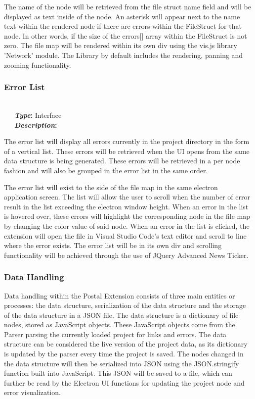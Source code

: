 \documentclass[letterpaper,10pt,titlepage,draftclsnofoot,onecolumn,onesided] {IEEEtran}
\newcommand{\bolditin}[2]{
	\-\ \-\ \-\ \textbf{\textit{#1}#2}
}
\begin{document}
The name of the node will be retrieved from the file struct name field and will be displayed as text inside of the node.
An asterisk will appear next to the name text within the rendered node if there are errors within the FileStruct for that node. In other words, if the size of the errors[] array within the FileStruct is not zero.
The file map will be rendered within its own div using the vis.js library 'Network' module. 
The Library by default includes the rendering, panning and zooming functionality. \cite{visjs}
	
\subsubsection{Error List}
\hfill \\
\bolditin{Type}{:} Interface \\
\bolditin{Description}{:} 
The error list will display all errors currently in the project directory in the form of a vertical list. 
These errors will be retrieved when the UI opens from the same data structure is being generated. 
These errors will be retrieved in a per node fashion and will also be grouped in the error list in the same order. 
	
The error list will exist to the side of the file map in the same electron application screen. 
The list will allow the user to scroll when the number of error result in the list exceeding the electron window height. 
When an error in the list is hovered over, these errors will highlight the corresponding node in the file map by changing the color value of said node. 
When an error in the list is clicked, the extension will open the file in Visual Studio Code's text editor and scroll to line where the error exists.
The error list will be in its own div and scrolling functionality will be achieved through the use of JQuery Advanced News Ticker. \cite{newst}
	
\subsubsection{Data Handling}
Data handling within the Postal Extension consists of three main entities or processes: the data structure, serialization of the data structure and the storage of the data structure in a JSON file.
The data structure is a dictionary of file nodes, stored as JavaScript objects. These JavaScript objects come from the Parser parsing the currently loaded project for links and errors.
The data structure can be considered the live version of the project data, as its dictionary is updated by the parser every time the project is saved. 
The nodes changed in the data structure will then be serialized into JSON using the JSON.stringify function built into JavaScript.
This JSON will be saved to a file, which can further be read by the Electron UI functions for updating the project node and error visualization. \cite{stringify}
	
\end{document}
